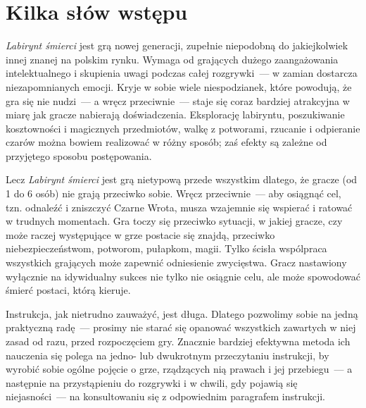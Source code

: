 \section{Kilka słów wstępu}
\textit{Labirynt śmierci} jest grą nowej generacji, zupełnie niepodobną do jakiejkolwiek innej znanej na polskim rynku. Wymaga od grających dużego zaangażowania intelektualnego i skupienia uwagi podczas całej rozgrywki~--- w zamian dostarcza niezapomnianych emocji. Kryje w sobie wiele niespodzianek, które powodują, że gra się nie nudzi~--- a wręcz przeciwnie~--- staje się coraz bardziej atrakcyjna w miarę jak gracze nabierają doświadczenia. Eksplorację labiryntu, poszukiwanie kosztowności i magicznych przedmiotów, walkę z potworami, rzucanie i odpieranie czarów można bowiem realizować w różny sposób; zaś efekty są zależne od przyjętego sposobu postępowania.

Lecz \textit{Labirynt śmierci} jest grą nietypową przede wszystkim dlatego, że gracze (od 1 do 6 osób) nie grają przeciwko sobie. Wręcz przeciwnie~--- aby osiągnąć cel, tzn. odnaleźć i zniszczyć Czarne Wrota, musza wzajemnie się wspierać i ratować w trudnych momentach. Gra toczy się przeciwko sytuacji, w jakiej gracze, czy może raczej występujące w grze postacie się znajdą, przeciwko niebezpieczeństwom, potworom, pułapkom, magii. Tylko ścisła wspólpraca wszystkich grających może zapewnić odniesienie zwycięstwa. Gracz nastawiony wyłącznie na idywidualny sukces nie tylko nie osiągnie celu, ale może spowodować śmierć postaci, którą kieruje.

Instrukcja, jak nietrudno zauważyć, jest długa. Dlatego pozwolimy sobie na jedną praktyczną radę~--- prosimy nie starać się opanować wszystkich zawartych w niej zasad od razu, przed rozpoczęciem gry. Znacznie bardziej efektywna metoda ich nauczenia się polega na jedno- lub dwukrotnym przeczytaniu instrukcji, by wyrobić sobie ogólne pojęcie o grze, rządzących nią prawach i jej przebiegu~--- a następnie na przystąpieniu do rozgrywki i w chwili, gdy pojawią się niejasności~--- na konsultowaniu się z odpowiednim paragrafem instrukcji.
